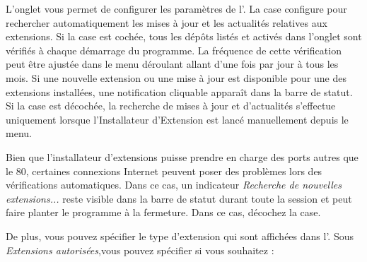 L'onglet  vous permet de configurer les paramètres de l'. La case  configure \qg pour rechercher automatiquement les mises à jour et les actualités relatives aux extensions. Si la case est cochée, tous les dépôts listés et activés dans l'onglet  sont vérifiés à chaque démarrage du programme. La fréquence de cette vérification peut être ajustée dans le menu déroulant allant d'une fois par jour à tous les mois. Si une nouvelle extension ou une mise à jour est disponible pour une des extensions installées, une notification cliquable apparaît dans la barre de statut. Si la case est décochée, la recherche de mises à jour et d'actualités s'effectue uniquement lorsque l'Installateur d'Extension est lancé manuellement depuis le menu.

Bien que l'installateur d'extensions puisse prendre en charge des ports autres que le 80, certaines connexions Internet peuvent poser des problèmes lors des vérifications automatiques. Dans ce cas, un indicateur \textit{Recherche de nouvelles extensions...} reste visible dans la barre de statut durant toute la session \qg et peut faire planter le programme à la fermeture. Dans ce cas, décochez la case.

De plus, vous pouvez spécifier le type d'extension qui sont affichées dans l'. Sous \textit{Extensions autorisées},vous pouvez spécifier si vous souhaitez :

